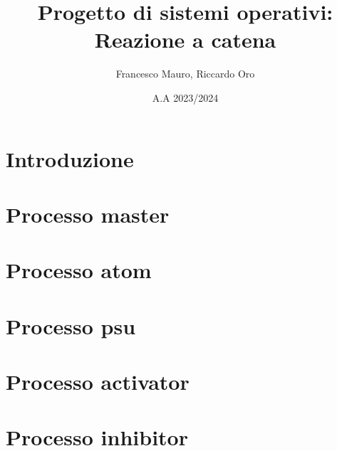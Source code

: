 \documentclass{article}
\title{Progetto di sistemi operativi: Reazione a catena}
\author{Francesco Mauro, Riccardo Oro}
\date{A.A 2023/2024}
\begin{document}
\maketitle
\tableofcontents

\chapter{Introduzione} 

\chapter{Processo master}

\chapter{Processo atom}

\chapter{Processo psu}

\chapter{Processo activator}

\chapter{Processo inhibitor}
\end{document}

